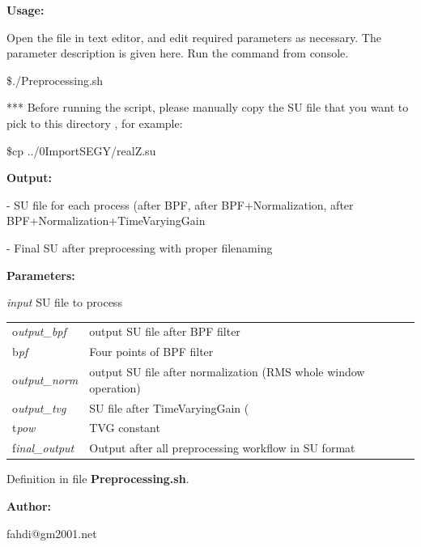 \documentclass{article}
\begin{document}
\vspace{4pt}
\textbf{Usage:}

\vspace{4pt}
Open the file in text editor, and edit required parameters as necessary. The parameter 
description is given here. Run the command from console. 

\vspace{4pt}
\$./Preprocessing.sh 

\vspace{16pt}
*** Before running the script, please manually copy the SU file that you want to 
pick to this directory , for example:

\vspace{4pt}
\$cp ../0ImportSEGY/realZ.su

\vspace{16pt}
\textbf{Output:}

\vspace{4pt}
- SU file for each process (after BPF, after BPF+Normalization, after BPF+Normalization+TimeVaryingGain

\vspace{4pt}
- Final SU after preprocessing with proper filenaming 

\vspace{4pt}
\textbf{Parameters:}

\vspace{4pt}
\textit{input} SU file to process 

\vspace{4pt}
\begin{tabular}{|>{\raggedright}p{54pt}|>{\raggedright}p{245pt}|}
\hline
\tabularnewline
\hline
o\textit{utput\_bpf}  & output SU file after BPF filter \tabularnewline
\hline
b\textit{pf}  & Four points of BPF filter \tabularnewline
\hline
o\textit{utput\_norm}  & output SU file after normalization (RMS whole window operation) 
\tabularnewline
\hline
o\textit{utput\_tvg}  & SU file after TimeVaryingGain ( \tabularnewline
\hline
t\textit{pow}  & TVG constant \tabularnewline
\hline
f\textit{inal\_output}  & Output after all preprocessing workflow in SU format 
\tabularnewline
\hline
\end{tabular}

\vspace{1pt}
Definition in file \textbf{Preprocessing.sh}.

\vspace{4pt}
\textbf{Author:}

\vspace{4pt}
\leftskip=18pt
fahdi@gm2001.net 
\end{document}
